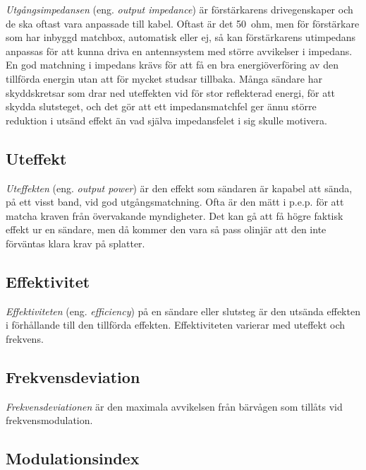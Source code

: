 \emph{Utgångsimpedansen} (eng. \emph{output impedance}) är förstärkarens
drivegenskaper och de ska oftast vara anpassade till kabel.
Oftast är det 50~ohm, men för förstärkare som har inbyggd matchbox,
automatisk eller ej, så kan förstärkarens utimpedans anpassas
för att kunna driva en antennsystem med större avvikelser i impedans.
En god matchning i impedans krävs för att få en bra energiöverföring av den
tillförda energin utan att för mycket studsar tillbaka.
Många sändare har skyddskretsar som drar ned uteffekten vid för stor
reflekterad energi, för att skydda slutsteget, och det gör att ett
impedansmatchfel ger ännu större reduktion i utsänd effekt än vad själva
impedansfelet i sig skulle motivera.

\subsection{Uteffekt}

\emph{Uteffekten} (eng. \emph{output power}) är den effekt som sändaren är
kapabel att sända, på ett visst band, vid god utgångsmatchning.
Ofta är den mätt i p.e.p. för att matcha kraven från övervakande myndigheter.
Det kan gå att få högre faktisk effekt ur en sändare, men då kommer den vara
så pass olinjär att den inte förväntas klara krav på splatter.

\subsection{Effektivitet}

\emph{Effektiviteten} (eng. \emph{efficiency}) på en sändare eller slutsteg
är den utsända effekten i förhållande till den tillförda effekten.
Effektiviteten varierar med uteffekt och frekvens.

\subsection{Frekvensdeviation}

\emph{Frekvensdeviationen} är den maximala avvikelsen från bärvågen som
tillåts vid frekvensmodulation.

\subsection{Modulationsindex}

